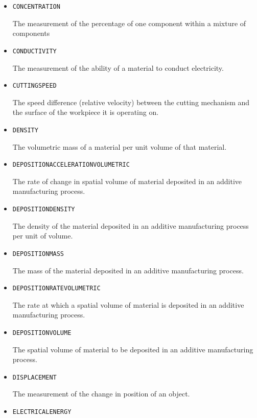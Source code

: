 \begin{itemize}
\item \texttt{CONCENTRATION}  

The measurement of the percentage of one component within a mixture of components


\item \texttt{CONDUCTIVITY}  

The measurement of the ability of a material to conduct electricity.


\item \texttt{CUTTING\textunderscore SPEED}  

The speed difference (relative velocity) between the cutting mechanism and the surface of the workpiece it is operating on.


\item \texttt{DENSITY}  

The volumetric mass of a material per unit volume of that material.


\item \texttt{DEPOSITION\textunderscore ACCELERATION\textunderscore VOLUMETRIC}  

The rate of change in spatial volume of material deposited in an additive manufacturing process.


\item \texttt{DEPOSITION\textunderscore DENSITY}  

The density of the material deposited in an additive manufacturing process per unit of volume.


\item \texttt{DEPOSITION\textunderscore MASS}  

The mass of the material deposited in an additive manufacturing process.


\item \texttt{DEPOSITION\textunderscore RATE\textunderscore VOLUMETRIC}  

The rate at which a spatial volume of material is deposited in an additive manufacturing process.


\item \texttt{DEPOSITION\textunderscore VOLUME}  

The spatial volume of material to be deposited in an additive manufacturing process.


\item \texttt{DISPLACEMENT}  

The measurement of the change in position of an object.


\item \texttt{ELECTRICAL\textunderscore ENERGY}  


\end{itemize}
